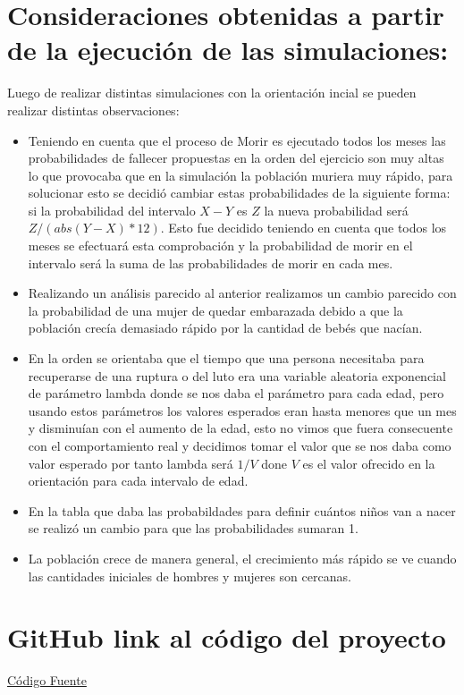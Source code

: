 \documentclass[12pt]{article}
\begin{document}
\section{Consideraciones obtenidas a partir de  la ejecuci\'on de las simulaciones:}
Luego de realizar distintas simulaciones con la orientaci\'on incial se pueden realizar distintas observaciones:
\begin{itemize}
    \item Teniendo en cuenta que el proceso de Morir es ejecutado todos los meses las probabilidades de fallecer propuestas en la orden del ejercicio son muy altas
    lo que provocaba que en la simulaci\'on la poblaci\'on muriera muy r\'apido, para solucionar esto se decidi\'o cambiar estas probabilidades de la siguiente forma: si la probabilidad del intervalo $X - Y$ es $Z$ 
    la nueva probabilidad ser\'a $Z / (abs(Y - X) * 12)$. Esto fue decidido teniendo en cuenta que todos los meses se efectuar\'a esta comprobaci\'on y la probabilidad de morir en el intervalo ser\'a la suma de las probabilidades de morir en cada mes.
    
    \item Realizando un an\'alisis parecido al anterior realizamos un cambio parecido con la probabilidad de una mujer de quedar embarazada debido a que la poblaci\'on crec\'ia demasiado r\'apido por la cantidad de beb\'es que nac\'ian.
    
    \item En la orden se orientaba que el tiempo que una persona necesitaba para recuperarse de una ruptura o del luto era una variable aleatoria exponencial de par\'ametro lambda donde se nos daba el par\'ametro para cada edad, pero usando estos par\'ametros
    los valores esperados eran hasta menores que un mes y disminu\'ian con el aumento de la edad, esto no vimos que fuera consecuente con el comportamiento real y decidimos tomar el valor que se nos daba como valor esperado por tanto lambda ser\'a $1/V$ done $V$ es el valor ofrecido 
    en la orientaci\'on para cada intervalo de edad.

    \item En la tabla que daba las probabildades para definir cu\'antos ni\~nos van a nacer se realiz\'o un cambio para que las probabilidades sumaran 1.
    
    \item La poblaci\'on crece de manera general, el crecimiento m\'as r\'apido se ve cuando las cantidades iniciales de hombres y mujeres son cercanas.
\end{itemize}

\section{GitHub link al c\'odigo del proyecto}
\href{https://github.com/stdevMauricio1802/Simulation}{C\'odigo Fuente}
\end{document}
